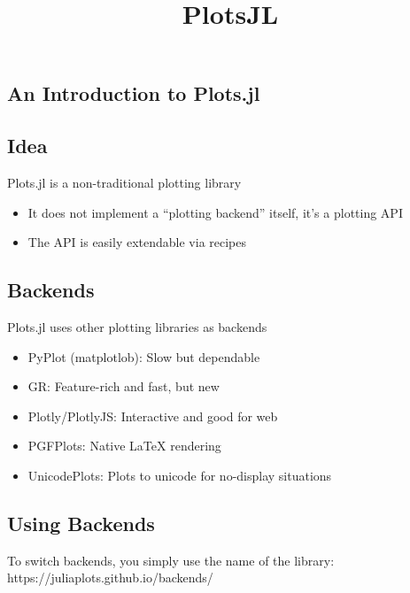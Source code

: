 \documentclass[11pt]{article}
\title{PlotsJL}
\begin{document}
    
    
    \maketitle
    
    

    
    \subsection{An Introduction to
Plots.jl}\label{an-introduction-to-plots.jl}

    \subsection{Idea}\label{idea}

Plots.jl is a non-traditional plotting library

\begin{itemize}
\itemsep1pt\parskip0pt
\item
  It does not implement a ``plotting backend'' itself, it's a plotting
  API
\item
  The API is easily extendable via recipes
\end{itemize}

    \subsection{Backends}\label{backends}

Plots.jl uses other plotting libraries as backends

\begin{itemize}
\itemsep1pt\parskip0pt
\item
  PyPlot (matplotlob): Slow but dependable
\item
  GR: Feature-rich and fast, but new
\item
  Plotly/PlotlyJS: Interactive and good for web
\item
  PGFPlots: Native LaTeX rendering
\item
  UnicodePlots: Plots to unicode for no-display situations
\end{itemize}

    \subsection{Using Backends}\label{using-backends}

To switch backends, you simply use the name of the library:
https://juliaplots.github.io/backends/
\end{document}
